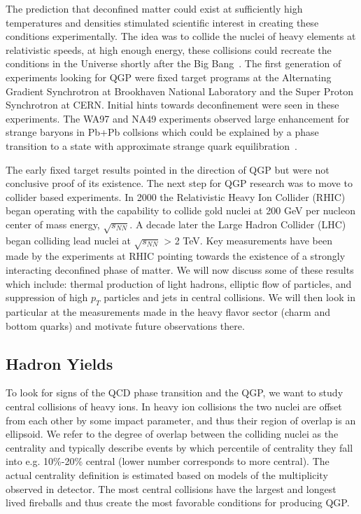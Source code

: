 The prediction that deconfined matter could exist at sufficiently high temperatures and densities stimulated scientific interest in creating these conditions experimentally. The idea was to collide the nuclei of heavy elements at relativistic speeds, at high enough energy, these collisions could recreate the conditions in the Universe shortly after the Big Bang~\cite{Baym}. The first generation of experiments looking for QGP were fixed target programs at the Alternating Gradient Synchrotron at Brookhaven National Laboratory and the Super Proton Synchrotron at CERN. Initial hints towards deconfinement were seen in these experiments. The WA97 and NA49 experiments observed large enhancement for strange baryons in Pb+Pb collsions which could be explained by a phase transition to a state with approximate strange quark equilibration~\cite{StrangeE}.

The early fixed target results pointed in the direction of QGP but were not conclusive proof of its existence. The next step for QGP research was to move to collider based experiments. In 2000 the Relativistic Heavy Ion Collider (RHIC) began operating with the capability to collide gold nuclei at 200 GeV per nucleon center of mass energy, $\sqrt{s_{NN}}$. A decade later the Large Hadron Collider (LHC) began colliding lead nuclei at $\sqrt{s_{NN}}$ > 2 TeV. Key measurements have been made by the experiments at RHIC pointing towards the existence of a strongly interacting deconfined phase of matter. We will now discuss some of these results which include: thermal production of light hadrons, elliptic flow of particles, and suppression of high $p_T$ particles and jets in central collisions. We will then look in particular at the measurements made in the heavy flavor sector (charm and bottom quarks) and motivate future observations there.

\subsection{Hadron Yields}

To look for signs of the QCD phase transition and the QGP, we want to study central collisions of heavy ions. In heavy ion collisions the two nuclei are offset from each other by some impact parameter, and thus their region of overlap is an ellipsoid. We refer to the degree of overlap between the colliding nuclei as the centrality and typically describe events by which percentile of centrality they fall into e.g. 10\%-20\% central (lower number corresponds to more central). The actual centrality definition is estimated based on models of the multiplicity observed in detector. The most central collisions have the largest and longest lived fireballs and thus create the most favorable conditions for producing QGP. 

